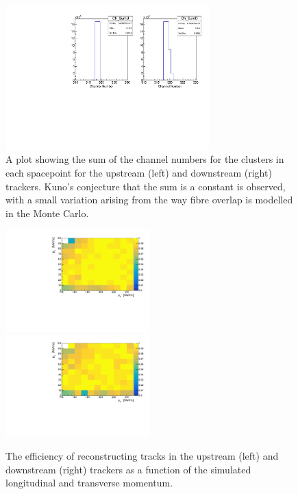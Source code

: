  \begin{figure}[p]
    \centering
    \includegraphics[width=0.7\textwidth, angle=0]{08-Performance/Kuno6mm.pdf}
    \caption{\label{fig:kuno} A plot showing the sum of the channel numbers for the clusters in each spacepoint for the upstream (left) and downstream (right) trackers. Kuno's conjecture that the sum is a constant is observed, with a small variation arising from the way fibre overlap is modelled in the Monte Carlo.}
  \end{figure}

  \begin{figure}[p]
    \centering
    \includegraphics[width=0.495\textwidth, angle=0]{08-Performance/upstream_track_efficiency.pdf}
    \includegraphics[width=0.495\textwidth, angle=0]{08-Performance/downstream_track_efficiency.pdf}\\
    \caption{\label{fig:track_efficiency} The efficiency of reconstructing tracks in the upstream (left) and downstream (right) trackers as a function of the simulated longitudinal and transverse momentum.}
  \end{figure}


